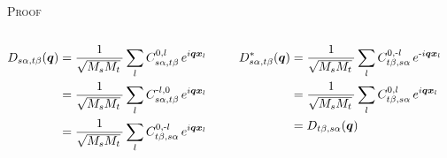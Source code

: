 \begin{frame}
\begin{itemize}
    \begin{block}{\textsc{Proof}}
      \small
      \begin{columns}[t]
        \begin{column}{0.5\textwidth}
          \begin{align*}
            D_{s\alpha,t\beta}(\boldsymbol{q})
            &=
            {1\over\sqrt{M_sM_t}\,}
            \sum_l
            C_{s\alpha,t\beta}^{0, l}\,
              e^{i\boldsymbol{q}\boldsymbol{x}_l} \cr
            &= 
            {1\over\sqrt{M_sM_t}\,}
            \sum_l
            C_{s\alpha,t\beta}^{\text{-}l, 0}\,
              e^{i\boldsymbol{q}\boldsymbol{x}_l} \cr
            &= 
            {1\over\sqrt{M_sM_t}\,}
            \sum_l
            C_{t\beta,s\alpha}^{0, \text{-}l}\,
              e^{i\boldsymbol{q}\boldsymbol{x}_l} \cr
          \end{align*}
        \end{column}
        \begin{column}{0.4\textwidth}
          \begin{align*}
            D^*_{s\alpha,t\beta}(\boldsymbol{q})
            &=
            {1\over\sqrt{M_sM_t}\,}
            \sum_l
            C_{t\beta,s\alpha}^{0, \text{-}l}\,
              e^{\text{-}i\boldsymbol{q}\boldsymbol{x}_l} \cr
            &=
            {1\over\sqrt{M_sM_t}\,}
            \sum_l
            C_{t\beta,s\alpha}^{0, l}\,
              e^{i\boldsymbol{q}\boldsymbol{x}_l} \cr
            &= 
            D_{t\beta,s\alpha}(\boldsymbol{q})
          \end{align*}
        \end{column}
        
      \end{columns}
    \end{block}
  \end{itemize}
\end{frame}


